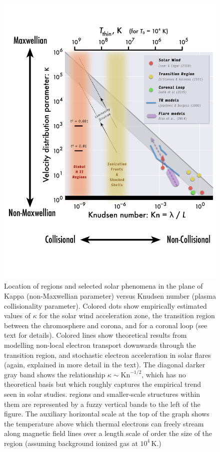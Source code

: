 \documentclass{emulateapj}
\newcommand\Kn{\ensuremath{\mathrm{Kn}}}
\newcommand\hii{\ion{H}{2}}
\begin{document}
\begin{figure}
  \centering
  \includegraphics[width=0.8\linewidth]{kappa-versus-knudsen-graph}
  \caption{Location of \hii{} regions and selected solar phenomena in
    the plane of Kappa (non-Maxwellian parameter) versus Knudsen
    number (plasma collisionality parameter).  Colored dots show
    empirically estimated values of \(\kappa\) for the solar wind
    acceleration zone, the transition region between the chromosphere
    and corona, and for a coronal loop (see text for details).  Colored
    lines show theoretical results from modelling non-local electron transport
    downwards through the transition region, and stochastic electron
    acceleration in solar flares (again, explained in more detail in
    the text).  The diagonal darker gray band shows the relationship
    \(\kappa \sim \Kn^{-1/2}\), which has no theoretical basis but
    which roughly captures the empirical trend seen in solar
    studies. \hii{} regions and smaller-scale structures within them
    are represented by a fuzzy vertical bands to the left of the figure.
    The auxiliary horizontal scale at the top of the graph shows the
    temperature above which thermal electrons can freely stream along
    magnetic field lines over a length scale of order the size of the
    region (assuming background ionized gas at \(10^4\)\,K.)}
  \label{fig:kappa-knudsen}
\end{figure}
\end{document}
